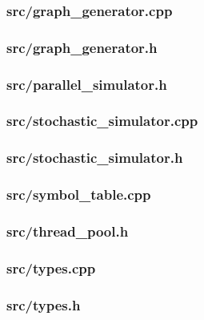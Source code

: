 \subsubsection{src/graph\_generator.cpp}

\newpage
\subsubsection{src/graph\_generator.h}

\newpage
\subsubsection{src/parallel\_simulator.h}

\newpage
\subsubsection{src/stochastic\_simulator.cpp}

\newpage
\subsubsection{src/stochastic\_simulator.h}

\newpage
\subsubsection{src/symbol\_table.cpp}

\newpage
\subsubsection{src/thread\_pool.h}

\newpage
\subsubsection{src/types.cpp}

\newpage
\subsubsection{src/types.h}



